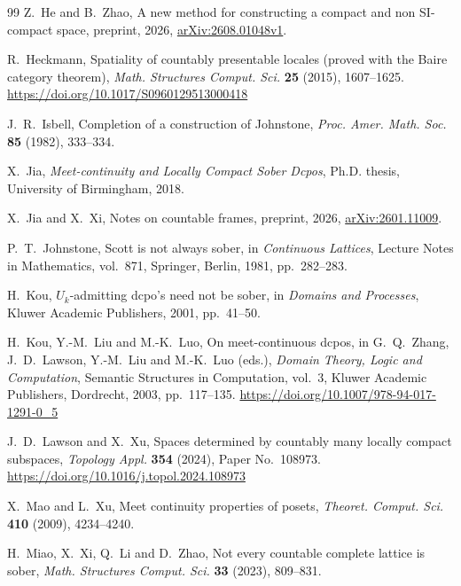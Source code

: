 \documentclass[11pt,reqno]{amsart}
\theoremstyle{definition}
\numberwithin{equation}{section}
\begin{document}
\begin{thebibliography}{99}
Z.~He and B.~Zhao,
A new method for constructing a compact and non SI-compact space,
preprint, 2026, \href{https://arxiv.org/abs/2608.01048v1}{arXiv:2608.01048v1}.

R.~Heckmann,
Spatiality of countably presentable locales (proved with the Baire category
theorem), \emph{Math. Structures Comput. Sci.} \textbf{25} (2015),
1607--1625.
\url{https://doi.org/10.1017/S0960129513000418}

J.~R.~Isbell,
Completion of a construction of Johnstone,
\emph{Proc. Amer. Math. Soc.} \textbf{85} (1982), 333--334.

X.~Jia,
\emph{Meet-continuity and Locally Compact Sober Dcpos},
Ph.D. thesis, University of Birmingham, 2018.

X.~Jia and X.~Xi,
Notes on countable frames,
preprint, 2026, \href{https://arxiv.org/abs/2601.11009}{arXiv:2601.11009}.

P.~T.~Johnstone,
Scott is not always sober,
in \emph{Continuous Lattices}, Lecture Notes in Mathematics, vol.~871,
Springer, Berlin, 1981, pp.~282--283.

H.~Kou,
$U_k$-admitting dcpo's need not be sober,
in \emph{Domains and Processes}, Kluwer Academic Publishers,
2001, pp.~41--50.

H.~Kou, Y.-M.~Liu and M.-K.~Luo,
On meet-continuous dcpos,
in G.~Q.~Zhang, J.~D.~Lawson, Y.-M.~Liu and M.-K.~Luo (eds.),
\emph{Domain Theory, Logic and Computation},
Semantic Structures in Computation, vol.~3,
Kluwer Academic Publishers, Dordrecht, 2003, pp.~117--135.
\url{https://doi.org/10.1007/978-94-017-1291-0_5}

J.~D.~Lawson and X.~Xu,
Spaces determined by countably many locally compact subspaces,
\emph{Topology Appl.} \textbf{354} (2024), Paper No.~108973.
\url{https://doi.org/10.1016/j.topol.2024.108973}

X.~Mao and L.~Xu,
Meet continuity properties of posets,
\emph{Theoret. Comput. Sci.} \textbf{410} (2009), 4234--4240.

H.~Miao, X.~Xi, Q.~Li and D.~Zhao,
Not every countable complete lattice is sober,
\emph{Math. Structures Comput. Sci.} \textbf{33} (2023), 809--831.


\end{thebibliography}
\end{document}

